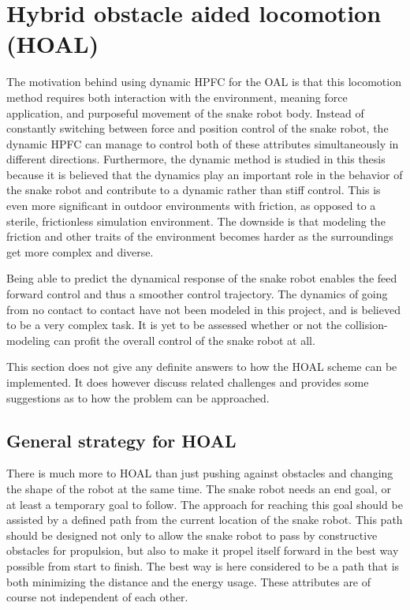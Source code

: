 \section{Hybrid obstacle aided locomotion (HOAL)}\label{sec:dhpfc-oal}

The motivation behind using dynamic HPFC for the OAL is that this locomotion method requires both interaction with the environment, meaning force application, and purposeful movement of the snake robot body. Instead of constantly switching between force and position control of the snake robot, the dynamic HPFC can manage to control both of these attributes simultaneously in different directions. Furthermore, the dynamic method is studied in this thesis because it is believed that the dynamics play an important role in the behavior of the snake robot and contribute to a dynamic rather than stiff control. This is even more significant in outdoor environments with friction, as opposed to a sterile, frictionless simulation environment. The downside is that modeling the friction and other traits of the environment becomes harder as the surroundings get more complex and diverse.

Being able to predict the dynamical response of the snake robot enables the feed forward control and thus a smoother control trajectory. 
The dynamics of going from no contact to contact have not been modeled in this project, and is believed to be a very complex task. It is yet to be assessed whether or not the collision-modeling can profit the overall control of the snake robot at all.

This section does not give any definite answers to how the HOAL scheme can be implemented. It does however discuss related challenges and provides some suggestions as to how the problem can be approached.

\subsection{General strategy for HOAL}

There is much more to HOAL than just pushing against obstacles and changing the shape of the robot at the same time. The snake robot needs an end goal, or at least a temporary goal to follow. The approach for reaching this goal should be assisted by a defined path from the current location of the snake robot. This path should be designed not only to allow the snake robot to pass by constructive obstacles for propulsion, but also to make it propel itself forward in the best way possible from start to finish. The best way is here considered to be a path that is both minimizing the distance and the energy usage. These attributes are of course not independent of each other.

